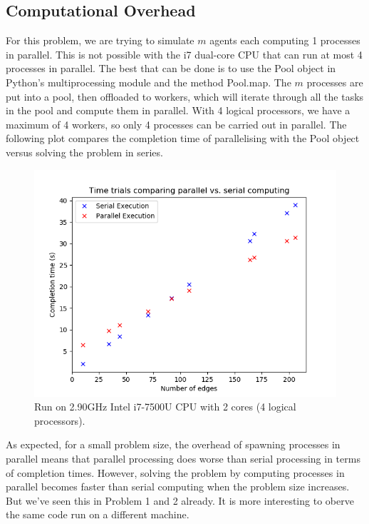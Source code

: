 \documentclass[12pt]{article}
\begin{document}
\subsection*{Computational Overhead}

For this problem, we are trying to simulate $m$ agents each computing 1 processes in parallel. This is not possible with the i7 dual-core CPU that can run at most 4 processes in parallel. The best that can be done is to use the Pool object in Python's multiprocessing module and the method Pool.map. The $m$ processes are put into a pool, then offloaded to workers, which will iterate through all the tasks in the pool and compute them in parallel. With 4 logical processors, we have a maximum of 4 workers, so only 4 processes can be carried out in parallel. The following plot compares the completion time of parallelising with the Pool object versus solving the problem in series.

\begin{figure}[H]
	\includegraphics[scale=1]{Problem3-TimeTrial.png}
	\caption{Run on 2.90GHz Intel i7-7500U CPU with 2 cores (4 logical processors).}
\end{figure}

As expected, for a small problem size, the overhead of spawning processes in parallel means that parallel processing does worse than serial processing in terms of completion times. However, solving the problem by computing processes in parallel becomes faster than serial computing when the problem size increases. But we've seen this in Problem 1 and 2 already. It is more interesting to oberve the same code run on a different machine.
\end{document}
